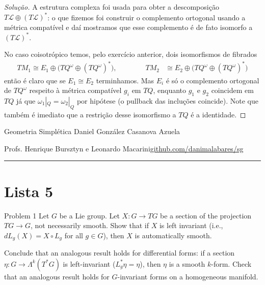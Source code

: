 \begin{proof}[Solução]
	A estrutura complexa foi usada para obter a descomposição $T\mathcal{L}\oplus (T\mathcal{L})^*$: o que fizemos foi construir o complemento ortogonal usando a métrica compatível e daí mostramos que esse complemento é de fato isomorfo a $(T\mathcal{L})^*$.

	No caso coisotrópico temos, pelo exercício anterior, dois isomorfismos de fibrados
\begin{align*}TM_1\cong E_1\oplus \Big(TQ^\omega\oplus (TQ^\omega)^*\Big),\qquad \qquad 
TM_2&\cong E_2\oplus \Big(TQ^\omega\oplus (TQ^\omega)^*\Big)
\end{align*}
então é claro que se $E_1\cong E_2$ terminhamos. Mas $E_i$ é só o complemento ortogonal de $TQ^\omega$ respeito à métrica compatível $g_i$ em $TQ$, enquanto $g_1$ e $g_2$ coincidem em $TQ$ já que $\omega_1|_{Q}=\omega_2|_{Q}$ por hipótese (o pullback das incluções coincide). Note que também é imediato que a restrição desse isomorfismo a $TQ$  é a identidade.
\end{proof}
\clearpage
\begin{minipage}{\textwidth}
	\begin{minipage}{1\textwidth}
		Geometria Simpl\'etica \hfill Daniel González Casanova Azuela
		
		{\small Profs. Henrique Bursztyn e Leonardo Macarini\hfill\href{https://github.com/danimalabares/sg}{github.com/danimalabares/sg}}
	\end{minipage}
\end{minipage}\vspace{.2cm}\hrule

\vspace{10pt}
\section{Lista 5}

\begin{thing1}{Problem 1}\leavevmode
	Let  $G$ be a Lie group. Let $X:G\longrightarrow TG$ be a section of the projection $TG\longrightarrow G$, not necessarily smooth. Show that if  $X$ is left invariant (i.e., $dL_g(X)=X\circ L_g$ for all $g\in G$), then $X$ is automatically smooth.

	Conclude that an analogous result holds for differential forms: if a section $\eta:G\to \Lambda^{k}(T^*G)$ is left-invariant ($L^*_g\eta=\eta$), then $\eta$ is a smooth $k$-form. Check that an analogous result holds for $G$-invariant forms on a homogeneous manifold.
\end{thing1}

